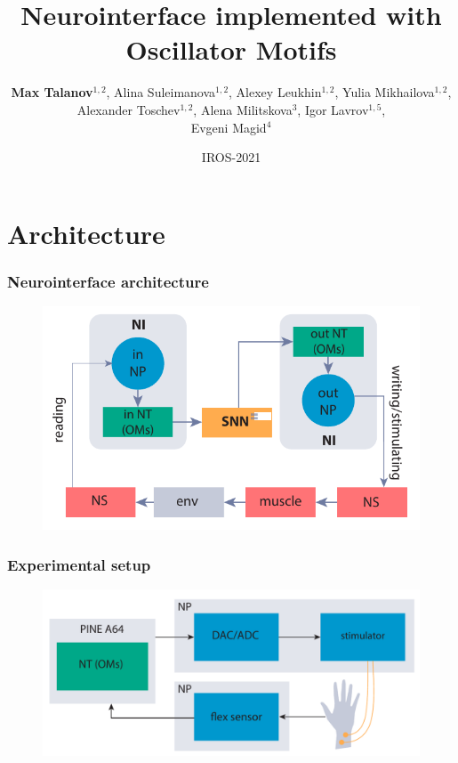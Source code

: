 \documentclass[12pt, aspectratio=169]{beamer}
\title[Neurointerface implemented with Oscillator Motifs]{Neurointerface implemented with Oscillator Motifs} %
\author[Max Talanov]{
  \textbf{Max Talanov}$^{1,2}$, Alina Suleimanova$^{1,2}$, Alexey Leukhin$^{1,2}$,
  Yulia Mikhailova$^{1,2}$, Alexander Toschev$^{1,2}$,
  Alena Militskova$^{3}$, Igor Lavrov$^{1,5}$,\\ Evgeni Magid$^{4}$
}
\institute[B-Rain Labs LLC, NcN laboratory, ITIS, KFU]%
{
  $^{1}$ B-Rain Labs LLC;
  $^{2}$ Neuromorphic computing and Neurosimulations laboratory, ITIS, KFU;
  $^{3}$ Institute of Fundamental Medicine and Biology, KFU;
  $^{4}$ Intelligent Robotic Systems Laboratory (LIRS), ITIS, KFU;
  $^{5}$ Department of Neurologic Surgery, Department of Physiology and Biomedical Engineering, Department of Neurology at Mayo Clinic.
  
\medskip
\textit{max.talanov@b-rain.org}\\ %

}
\date{IROS-2021} %
\begin{document}
\begin{frame}
\titlepage %
\end{frame}


\section{Architecture}
\begin{frame}
  \frametitle{Neurointerface architecture}
  \begin{figure}
    \includegraphics[width=0.9\linewidth]{NI_h}
  \end{figure}
\end{frame}

\begin{frame}
  \frametitle{Experimental setup}
  \begin{figure}
    \includegraphics[width=0.9\linewidth]{hld_exp}
  \end{figure}
\end{frame}
\end{document}

